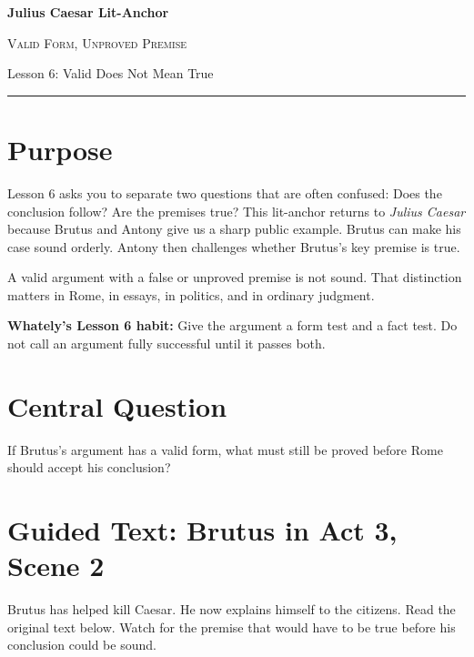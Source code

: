 \documentclass[12pt]{article}
\newcommand{\focusbox}[1]{\par\vspace{0.35em}\noindent\begingroup\setlength{\fboxsep}{6pt}\colorbox{gray!12}{\begin{minipage}{\dimexpr\linewidth-2\fboxsep\relax}#1\end{minipage}}\endgroup\par\vspace{0.45em}}
\begin{document}
\begin{center}
{\LARGE\bfseries Julius Caesar Lit-Anchor}\par\vspace{0.18em}
{\large\scshape Valid Form, Unproved Premise}\par\vspace{0.35em}
{Lesson 6: Valid Does Not Mean True}\par\vspace{0.55em}
\rule{0.82\textwidth}{0.4pt}
\end{center}

\section*{Purpose}
Lesson 6 asks you to separate two questions that are often confused: Does the conclusion follow? Are the premises true? This lit-anchor returns to \textit{Julius Caesar} because Brutus and Antony give us a sharp public example. Brutus can make his case sound orderly. Antony then challenges whether Brutus's key premise is true.

A valid argument with a false or unproved premise is not sound. That distinction matters in Rome, in essays, in politics, and in ordinary judgment.

\focusbox{\textbf{Whately's Lesson 6 habit:} Give the argument a form test and a fact test. Do not call an argument fully successful until it passes both.}

\section*{Central Question}
If Brutus's argument has a valid form, what must still be proved before Rome should accept his conclusion?

\section*{Guided Text: Brutus in Act 3, Scene 2}
Brutus has helped kill Caesar. He now explains himself to the citizens. Read the original text below. Watch for the premise that would have to be true before his conclusion could be sound.
\end{document}
